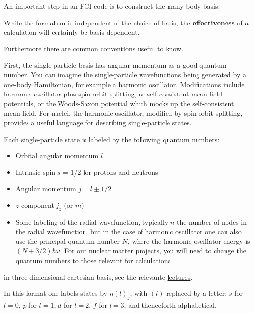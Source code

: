 \noindent
An important step in an FCI code  is to construct the many-body basis.  

While the formalism is independent of the choice of basis, the \textbf{effectiveness} of a calculation 
will certainly be basis dependent. 

Furthermore there are common conventions useful to know.

First, the single-particle basis has angular momentum as a good quantum number.  You can 
imagine the single-particle wavefunctions being generated by a one-body Hamiltonian, 
for example a harmonic oscillator.  Modifications include harmonic oscillator plus 
spin-orbit splitting, or self-consistent mean-field potentials, or the Woods-Saxon potential which mocks 
up the self-consistent mean-field. 
For nuclei, the harmonic oscillator, modified by spin-orbit splitting, provides a useful language 
for describing single-particle states.


Each single-particle state is labeled by the following quantum numbers: 

\begin{itemize}
\item Orbital angular momentum $l$

\item Intrinsic spin $s$ = 1/2 for protons and neutrons

\item Angular momentum $j = l \pm 1/2$

\item $z$-component $j_z$ (or $m$)

\item Some labeling of the radial wavefunction, typically $n$ the number of nodes in  the radial wavefunction, but in the case of harmonic oscillator one can also use the principal quantum number $N$, where the harmonic oscillator energy is $(N+3/2)\hbar \omega$.  For our nuclear matter projects, you will need to change the quantum numbers to those relevant for calculations
\end{itemize}

\noindent
in three-dimensional cartesian basis, see the relevante \href{{https://github.com/NuclearTalent/Course2ManyBodyMethods/blob/master/doc/pub/cc/pdf/Lectures1-2_TALENT_NuclearMatter_GH.pdf}}{lectures}.


In this format one labels states by $n(l)_j$, with $(l)$ replaced by a letter:
$s$ for $l=0$, $p$ for $l=1$, $d$ for $l=2$, $f$ for $l=3$, and thenceforth alphabetical.


